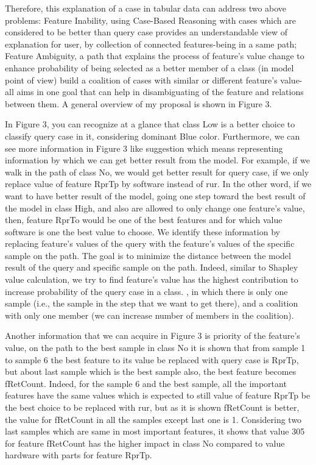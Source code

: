 \documentclass{llncs}
\begin{document}
Therefore, this explanation of a case in tabular data can address two above problems: Feature Inability, using Case-Based Reasoning with cases which are considered to be better than query case provides an understandable view of explanation for user, by collection of connected features-being in a same path; Feature Ambiguity, a path that explains the process of feature’s value change to enhance probability of being selected as a better member of a class (in model point of view) build a coalition of cases with similar or different feature’s value- all aims in one goal that can help in disambiguating of the feature and relations between them.
A general overview of my proposal is shown in Figure 3.  

In Figure 3, you can recognize at a glance that class Low is a better choice to classify query case in it, considering dominant Blue color. Furthermore, we can see more information in Figure 3 like suggestion which means representing information by which we can get better result from the model. For example, if we walk in the path of class No, we would get better result for query case, if we only replace value of feature RprTp by software instead of rur. In the other word, if we want to have better result of the model, going one step toward the best result of the model in class High, and also are allowed to only change one feature’s value, then, feature RprTo would be one of the best features and for which value software is one the best value to choose. We identify these information by
replacing feature's values of the query with the feature's values of the specific sample on the path. The goal is to minimize the distance between the model result of the query and specific sample on the path. Indeed, similar to Shapley value calculation, we try to find feature's value has the highest contribution to increase probability of the query case in a class.
, in which there is only one sample (i.e., the sample in the step that we want to get there), and a coalition with only one member (we can increase number of members in the coalition). 

Another information that we can acquire in Figure 3 is priority of the feature's value, on the path to the best sample in class No it is shown that from sample 1 to sample 6 the best feature to its value be replaced with query case is RprTp, but about last sample which is the best sample also, the best feature becomes fRetCount. Indeed, for the sample 6 and the best sample, all the important features have the same values which is expected to still value of feature RprTp be the best choice to be replaced with rur, but as it is shown fRetCount is better, the value for fRetCount in all the samples except last one is 1. Considering two last samples which are same in most important features, it shows that value 305 for feature fRetCount has the higher impact in class No compared to value hardware with parts for feature RprTp.
 
\end{document}
